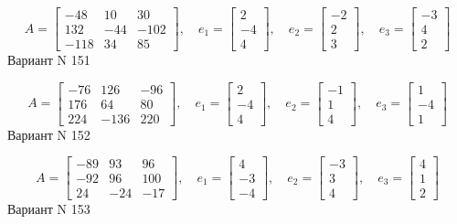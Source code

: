 \documentclass[11pt]{report}
\begin{document}
$$A = \left[\begin{matrix}-48 & 10 & 30\\132 & -44 & -102\\-118 & 34 & 85\end{matrix}\right],\quad e_1 = \left[\begin{matrix}2\\-4\\4\end{matrix}\right],\quad e_2 = \left[\begin{matrix}-2\\2\\3\end{matrix}\right],\quad e_3 = \left[\begin{matrix}-3\\4\\2\end{matrix}\right]$$Вариант N 151

$$A = \left[\begin{matrix}-76 & 126 & -96\\176 & 64 & 80\\224 & -136 & 220\end{matrix}\right],\quad e_1 = \left[\begin{matrix}2\\-4\\4\end{matrix}\right],\quad e_2 = \left[\begin{matrix}-1\\1\\4\end{matrix}\right],\quad e_3 = \left[\begin{matrix}1\\-4\\1\end{matrix}\right]$$Вариант N 152

$$A = \left[\begin{matrix}-89 & 93 & 96\\-92 & 96 & 100\\24 & -24 & -17\end{matrix}\right],\quad e_1 = \left[\begin{matrix}4\\-3\\-4\end{matrix}\right],\quad e_2 = \left[\begin{matrix}-3\\3\\4\end{matrix}\right],\quad e_3 = \left[\begin{matrix}4\\1\\2\end{matrix}\right]$$Вариант N 153
\end{document}
